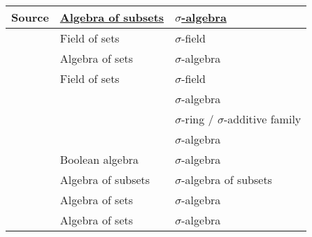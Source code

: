\begin{remark}
  \begin{table}[!ht]
    \centering
    \begin{tabular}{l l l}
      \toprule
      Source                                                            & \hyperref[def:algebra_of_subsets]{Algebra of subsets} & \hyperref[def:sigma_algebra]{\( \sigma \)-algebra} \\
      \midrule
      \cite[12]{Birkhoff1967LatticeTheory}                              & Field of sets                                         & \( \sigma \)-field                               \\
      \cite[21; 28]{Halmos1976MeasureTheory}                            & Algebra of sets                                       & \( \sigma \)-algebra                             \\
      \cite[24; 268]{HalmosGivant2009BooleanAlgebras}                   & Field of sets                                         & \( \sigma \)-field                               \\
      \cite[112]{Feller1971ProbabilityTheoryVol2}                       &                                                       & \( \sigma \)-algebra                             \\
      \cite[15]{Yoshida1980FunctionalAnalysis}                          &                                                       & \( \sigma \)-ring / \( \sigma \)-additive family \\
      \cite[def. 1.3]{Rudin1987RealAndComplexAnalysis}                  &                                                       & \( \sigma \)-algebra                             \\
      \cite[2]{Malliavin1995IntegrationAndProbability}                  & Boolean algebra                                       & \( \sigma \)-algebra                             \\
      \cite[\S 5.25]{Schechter1997AnalysisHandbook}                     & Algebra of subsets                                    & \( \sigma \)-algebra of subsets                  \\
      \cite[21]{Folland1999RealAnalysis}                                & Algebra of sets                                       & \( \sigma \)-algebra                             \\
      \cite[def. I.4.9]{Jech2006SetTheory}                              & Algebra of sets                                       & \( \sigma \)-algebra                             \\

\end{tabular}
\end{table}
\end{remark}
